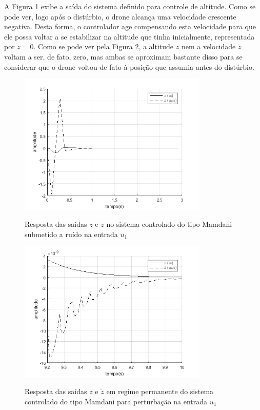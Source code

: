 A Figura \ref{fig:u1_mamdani_z} exibe a saída do sistema definido para controle de altitude. Como se pode ver, logo após o distúrbio, o drone alcança uma velocidade crescente negativa. Desta forma, o controlador age compensando esta velocidade para que ele possa voltar a se estabilizar na altitude que tinha inicialmente, representada por $z=0$. Como se pode ver pela Figura \ref{fig:u1_mamdani_z_regime_permanente}, a altitude $z$ nem a velocidade $\dot{z}$ voltam a ser, de fato, zero, mas ambas se aproximam bastante disso para se considerar que o drone voltou de fato à posição que assumia antes do distúrbio.

\begin{figure}[!htb]
    \centering
    \caption{Resposta das saídas $z$ e $\dot{z}$ no sistema controlado do tipo Mamdani submetido a ruído na entrada $u_1$}
    \includegraphics[width=0.8\textwidth]{./04-figuras/resultados/fis_u1/u1_mamdani_z}
    \label{fig:u1_mamdani_z}
\end{figure}

\begin{figure}[!htb]
    \centering
    \caption{Resposta das saídas $z$ e $\dot{z}$ em regime permanente do sistema controlado do tipo Mamdani para perturbação na entrada $u_1$}
    \includegraphics[width=0.8\textwidth]{./04-figuras/resultados/fis_u1/u1_mamdani_z_regime_permanente}
    \label{fig:u1_mamdani_z_regime_permanente}
\end{figure}

